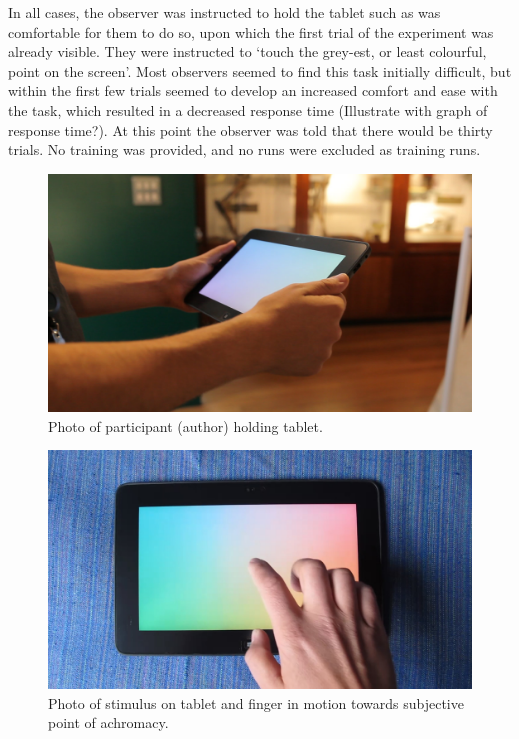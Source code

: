 In all cases, the observer was instructed to hold the tablet such as was comfortable for them to do so, upon which the first trial of the experiment was already visible. They were instructed to ‘touch the grey-est, or least colourful, point on the screen’. Most observers seemed to find this task initially difficult, but within the first few trials seemed to develop an increased comfort and ease with the task, which resulted in a decreased response time (Illustrate with graph of response time?). At this point the observer was told that there would be thirty trials. No training was provided, and no runs were excluded as training runs.

\begin{figure}[hbp]
\includegraphics[width=\textwidth]{figs/tablet/MVI_3213-1.jpg} %
\caption{Photo of participant (author) holding tablet.}
\label{fig:grant_demo}
\end{figure}

\begin{figure}[hbp]
\includegraphics[width=\textwidth]{figs/tablet/MVI_3889-4.jpg} %
\caption{Photo of stimulus on tablet and finger in motion towards subjective point of achromacy.}
\label{fig:finger}
\end{figure}

